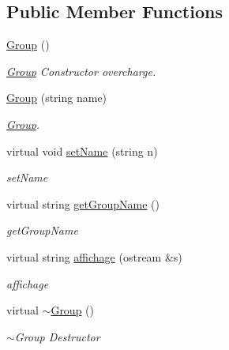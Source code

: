 \subsection*{Public Member Functions}
\begin{DoxyCompactItemize}
\item 
\hypertarget{classGroup_a7b74f9ac68e0504ccf2e2854b7355ff1}{\hyperlink{classGroup_a7b74f9ac68e0504ccf2e2854b7355ff1}{Group} ()}\label{classGroup_a7b74f9ac68e0504ccf2e2854b7355ff1}

\begin{DoxyCompactList}\small\item\em \hyperlink{classGroup}{Group} Constructor overcharge. \end{DoxyCompactList}\item 
\hyperlink{classGroup_af214c730661c4bb60beb522c9e727539}{Group} (string name)
\begin{DoxyCompactList}\small\item\em \hyperlink{classGroup}{Group}. \end{DoxyCompactList}\item 
virtual void \hyperlink{classGroup_a0c38a3d735a6bef446c1dceb27866408}{set\-Name} (string n)
\begin{DoxyCompactList}\small\item\em set\-Name \end{DoxyCompactList}\item 
virtual string \hyperlink{classGroup_a030dc7b666d67a51926d6236c1707f14}{get\-Group\-Name} ()
\begin{DoxyCompactList}\small\item\em get\-Group\-Name \end{DoxyCompactList}\item 
virtual string \hyperlink{classGroup_ae5bd44de2616138eacca19189be39d3c}{affichage} (ostream \&s)
\begin{DoxyCompactList}\small\item\em affichage \end{DoxyCompactList}\item 
\hypertarget{classGroup_ad21d9df83f85ecd5c8ce51715d9c7456}{virtual \hyperlink{classGroup_ad21d9df83f85ecd5c8ce51715d9c7456}{$\sim$\-Group} ()}\label{classGroup_ad21d9df83f85ecd5c8ce51715d9c7456}

\begin{DoxyCompactList}\small\item\em $\sim$\-Group Destructor \end{DoxyCompactList}\end{DoxyCompactItemize}


